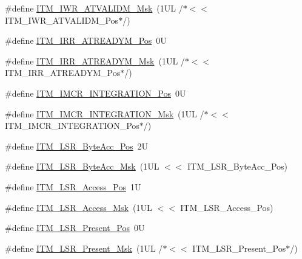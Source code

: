 \begin{DoxyCompactItemize}
\item 
\#define \hyperlink{group___c_m_s_i_s___i_t_m_ga67b969f8f04ed15886727788f0e2ffd7}{I\+T\+M\+\_\+\+I\+W\+R\+\_\+\+A\+T\+V\+A\+L\+I\+D\+M\+\_\+\+Msk}~(1\+U\+L /$\ast$$<$$<$ I\+T\+M\+\_\+\+I\+W\+R\+\_\+\+A\+T\+V\+A\+L\+I\+D\+M\+\_\+\+Pos$\ast$/)
\item 
\#define \hyperlink{group___c_m_s_i_s___i_t_m_ga259edfd1d2e877a62e06d7a240df97f4}{I\+T\+M\+\_\+\+I\+R\+R\+\_\+\+A\+T\+R\+E\+A\+D\+Y\+M\+\_\+\+Pos}~0U
\item 
\#define \hyperlink{group___c_m_s_i_s___i_t_m_ga3dbc3e15f5bde2669cd8121a1fe419b9}{I\+T\+M\+\_\+\+I\+R\+R\+\_\+\+A\+T\+R\+E\+A\+D\+Y\+M\+\_\+\+Msk}~(1\+U\+L /$\ast$$<$$<$ I\+T\+M\+\_\+\+I\+R\+R\+\_\+\+A\+T\+R\+E\+A\+D\+Y\+M\+\_\+\+Pos$\ast$/)
\item 
\#define \hyperlink{group___c_m_s_i_s___i_t_m_ga08de02bf32caf48aaa29f7c68ff5d755}{I\+T\+M\+\_\+\+I\+M\+C\+R\+\_\+\+I\+N\+T\+E\+G\+R\+A\+T\+I\+O\+N\+\_\+\+Pos}~0U
\item 
\#define \hyperlink{group___c_m_s_i_s___i_t_m_ga8838bd3dd04c1a6be97cd946364a3fd2}{I\+T\+M\+\_\+\+I\+M\+C\+R\+\_\+\+I\+N\+T\+E\+G\+R\+A\+T\+I\+O\+N\+\_\+\+Msk}~(1\+U\+L /$\ast$$<$$<$ I\+T\+M\+\_\+\+I\+M\+C\+R\+\_\+\+I\+N\+T\+E\+G\+R\+A\+T\+I\+O\+N\+\_\+\+Pos$\ast$/)
\item 
\#define \hyperlink{group___c_m_s_i_s___i_t_m_gabfae3e570edc8759597311ed6dfb478e}{I\+T\+M\+\_\+\+L\+S\+R\+\_\+\+Byte\+Acc\+\_\+\+Pos}~2U
\item 
\#define \hyperlink{group___c_m_s_i_s___i_t_m_ga91f492b2891bb8b7eac5b58de7b220f4}{I\+T\+M\+\_\+\+L\+S\+R\+\_\+\+Byte\+Acc\+\_\+\+Msk}~(1\+U\+L $<$$<$ I\+T\+M\+\_\+\+L\+S\+R\+\_\+\+Byte\+Acc\+\_\+\+Pos)
\item 
\#define \hyperlink{group___c_m_s_i_s___i_t_m_ga144a49e12b83ad9809fdd2769094fdc0}{I\+T\+M\+\_\+\+L\+S\+R\+\_\+\+Access\+\_\+\+Pos}~1U
\item 
\#define \hyperlink{group___c_m_s_i_s___i_t_m_gac8ae69f11c0311da226c0c8ec40b3d37}{I\+T\+M\+\_\+\+L\+S\+R\+\_\+\+Access\+\_\+\+Msk}~(1\+U\+L $<$$<$ I\+T\+M\+\_\+\+L\+S\+R\+\_\+\+Access\+\_\+\+Pos)
\item 
\#define \hyperlink{group___c_m_s_i_s___i_t_m_gaf5740689cf14564d3f3fd91299b6c88d}{I\+T\+M\+\_\+\+L\+S\+R\+\_\+\+Present\+\_\+\+Pos}~0U
\item 
\#define \hyperlink{group___c_m_s_i_s___i_t_m_gaa5bc2a7f5f1d69ff819531f5508bb017}{I\+T\+M\+\_\+\+L\+S\+R\+\_\+\+Present\+\_\+\+Msk}~(1\+U\+L /$\ast$$<$$<$ I\+T\+M\+\_\+\+L\+S\+R\+\_\+\+Present\+\_\+\+Pos$\ast$/)
\item 

\end{DoxyCompactItemize}
